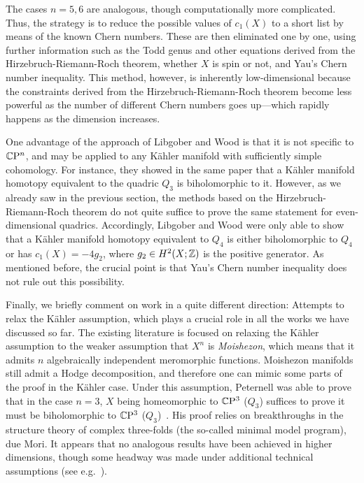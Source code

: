 The cases $n=5,6$ are analogous, though computationally more complicated. Thus, the strategy is to reduce the possible values of $c_1(X)$ to a short list by means of the known Chern numbers. These are then eliminated one by one, using further information such as the Todd genus and other equations derived from the Hirzebruch-Riemann-Roch theorem, whether $X$ is spin or not, and Yau's Chern number inequality. This method, however, is inherently low-dimensional because the constraints derived from the Hirzebruch-Riemann-Roch theorem become less powerful as the number of different Chern numbers goes up---which rapidly happens as the dimension increases.

One advantage of the approach of Libgober and Wood is that it is not specific to $\mathbb{C}\mathrm{P}^n$, and may be applied to any K\"ahler manifold with sufficiently simple cohomology. For instance, they showed in the same paper that a K\"ahler manifold homotopy equivalent to the quadric $Q_3$ is biholomorphic to it. However, as we already saw in the previous section, the methods based on the Hirzebruch-Riemann-Roch theorem do not quite suffice to prove the same statement for even-dimensional quadrics. Accordingly, Libgober and Wood were only able to show that a K\"ahler manifold homotopy equivalent to $Q_4$ is either biholomorphic to $Q_4$ or has $c_1(X)=-4g_2$, where $g_2\in H^2(X;\mathbb{Z})$ is the positive generator. As mentioned before, the crucial point is that Yau's Chern number inequality does not rule out this possibility.

Finally, we briefly comment on work in a quite different direction: Attempts to relax the K\"ahler assumption, which plays a crucial role in all the works we have discussed so far. The existing literature is focused on relaxing the K\"ahler assumption to the weaker assumption that $X^n$ is \emph{Moishezon}, which means that it admits $n$ algebraically independent meromorphic functions. Moishezon manifolds still admit a Hodge decomposition, and therefore one can mimic some parts of the proof in the K\"ahler case. Under this assumption, Peternell was able to prove that in the case $n=3$, $X$ being homeomorphic to $\mathbb{C}\mathrm{P}^3$ ($Q_3$) suffices to prove it must be biholomorphic to $\mathbb{C}\mathrm{P}^3$ ($Q_3$)~\cite{Pet1986}. His proof relies on breakthroughs in the structure theory of complex three-folds (the so-called minimal model program), due Mori. It appears that no analogous results have been achieved in higher dimensions, though some headway was made under additional technical assumptions (see e.g.~\cite{Nak1992,Pet1986a}).